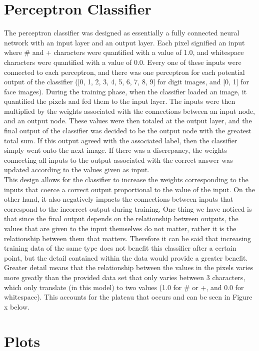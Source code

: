 \documentclass[12pt, letterpaper]{article}
\begin{document}
\section{Perceptron Classifier}
The perceptron classifier was designed as essentially a fully connected neural network with an input layer and an output layer. Each pixel signified an input where \# and + characters were quantified with a value of 1.0, and whitespace characters were quantified with a value of 0.0. Every one of these inputs were connected to each perceptron, and there was one perceptron for each potential output of the classifier ([0, 1, 2, 3, 4, 5, 6, 7, 8, 9] for digit images, and [0, 1] for face images). During the training phase, when the classifier loaded an image, it quantified the pixels and fed them to the input layer. The inputs were then multiplied by the weights associated with the connections between an input node, and an output node. These values were then totaled at the output layer, and the final output of the classifier was decided to be the output node with the greatest total sum. If this output agreed with the associated label, then the classifier simply went onto the next image. If there was a discrepancy, the weights connecting all inputs to the output associated with the correct answer was updated according to the values given as input. \\
This design allows for the classifier to increase the weights corresponding to the inputs that coerce a correct output proportional to the value of the input. On the other hand, it also negatively impacts the connections between inputs that correspond to the incorrect output during training. One thing we have noticed is that since the final output depends on the relationship between outputs, the values that are given to the input themselves do not matter, rather it is the relationship between them that matters. Therefore it can be said that increasing training data of the same type does not benefit this classifier after a certain point, but the detail contained within the data would provide a greater benefit. Greater detail means that the relationship between the values in the pixels varies more greatly than the provided data set that only varies between 3 characters, which only translate (in this model) to two values (1.0 for \# or +, and 0.0 for whitespace). This accounts for the plateau that occurs and can be seen in Figure x below. \\

\section{Plots}
\end{document}
